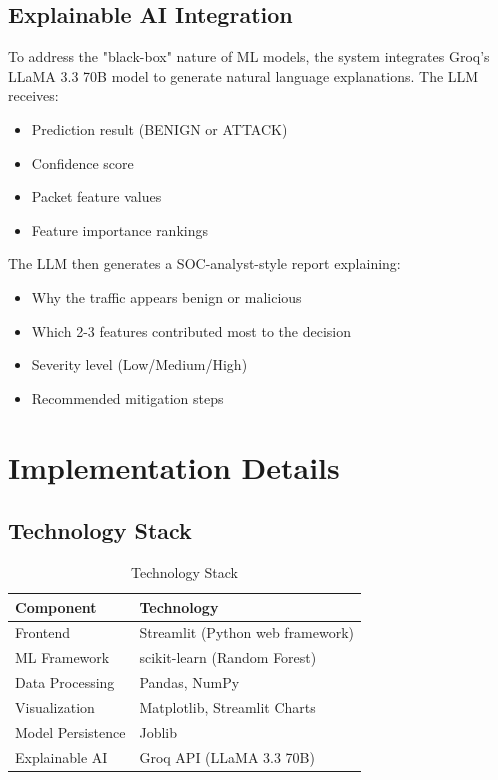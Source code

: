 \documentclass[12pt,a4paper]{article}
\begin{document}
\subsection{Explainable AI Integration}

To address the "black-box" nature of ML models, the system integrates Groq's LLaMA 3.3 70B model to generate natural language explanations. The LLM receives:

\begin{itemize}
    \item Prediction result (BENIGN or ATTACK)
    \item Confidence score
    \item Packet feature values
    \item Feature importance rankings
\end{itemize}

The LLM then generates a SOC-analyst-style report explaining:
\begin{itemize}
    \item Why the traffic appears benign or malicious
    \item Which 2-3 features contributed most to the decision
    \item Severity level (Low/Medium/High)
    \item Recommended mitigation steps
\end{itemize}

\section{Implementation Details}

\subsection{Technology Stack}

\begin{table}[H]
\centering
\begin{tabular}{|l|l|}
\hline
\textbf{Component} & \textbf{Technology} \\
\hline
Frontend & Streamlit (Python web framework) \\
ML Framework & scikit-learn (Random Forest) \\
Data Processing & Pandas, NumPy \\
Visualization & Matplotlib, Streamlit Charts \\
Model Persistence & Joblib \\
Explainable AI & Groq API (LLaMA 3.3 70B) \\
\hline
\end{tabular}
\caption{Technology Stack}
\end{table}
\end{document}
